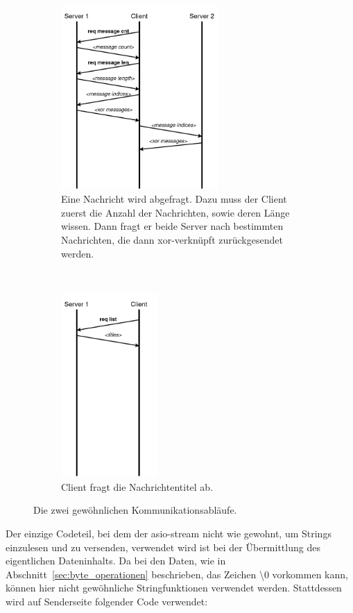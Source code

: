\documentclass[]{article}
\begin{document}
\begin{figure}[t!]
	\centering
	\begin{subfigure}[t]{0.5\textwidth}
		\centering
		\includegraphics[height=7cm]{img/communication_index.png}
		\caption{Eine Nachricht wird abgefragt. Dazu muss der Client zuerst die Anzahl der Nachrichten, sowie deren Länge wissen. Dann fragt er beide Server nach bestimmten Nachrichten, die dann xor-verknüpft zurückgesendet werden.}
	\end{subfigure}%
	~ 
	\begin{subfigure}[t]{0.5\textwidth}
		\centering
		\includegraphics[height=7cm]{img/communication_list.png}
		\caption{Client fragt die Nachrichtentitel ab.}
	\end{subfigure}
	\caption{Die zwei gewöhnlichen Kommunikationsabläufe.}
	\label{fig:communication_diagram}
\end{figure}

Der einzige Codeteil, bei dem der asio-stream nicht wie gewohnt, um Strings einzulesen und zu versenden, verwendet wird ist bei der Übermittlung des eigentlichen Dateninhalts. Da bei den Daten, wie in Abschnitt~\ref{sec:byte_operationen} beschrieben, das Zeichen \textbackslash 0 vorkommen kann, können hier nicht gewöhnliche Stringfunktionen verwendet werden. Stattdessen wird auf Senderseite folgender Code verwendet:
\end{document}
